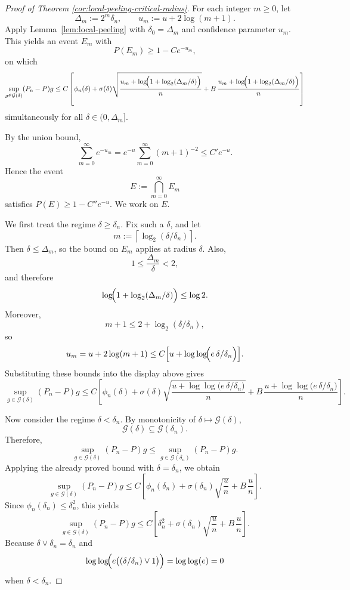 \documentclass[11pt]{article}
\theoremstyle{plain}
\theoremstyle{definition} %
\begin{document}
\begin{proof}[Proof of Theorem \ref{cor:local-peeling-critical-radius}]
For each integer \(m\ge 0\), let
\[
\Delta_m:=2^m\delta_n,
\qquad
u_m:=u+2\log(m+1).
\]
Apply Lemma~\ref{lem:local-peeling} with \(\delta_0=\Delta_m\) and confidence
parameter \(u_m\). This yields an event \(E_m\) with
\[
P(E_m)\ge 1-Ce^{-u_m},
\]
on which
\[
\sup_{g\in\mathcal G(\delta)} (P_n-P)g
\le
C\left[
\phi_n(\delta)
+
\sigma(\delta)
\sqrt{\frac{u_m+\log\!\Bigl(1+\log_2(\Delta_m/\delta)\Bigr)}{n}}
+
B\,\frac{u_m+\log\!\Bigl(1+\log_2(\Delta_m/\delta)\Bigr)}{n}
\right]
\]
simultaneously for all \(\delta\in(0,\Delta_m]\).

By the union bound,
\[
\sum_{m=0}^\infty e^{-u_m}
=
e^{-u}\sum_{m=0}^\infty (m+1)^{-2}
\le
C' e^{-u}.
\]
Hence the event
\[
E:=\bigcap_{m=0}^\infty E_m
\]
satisfies \(P(E)\ge 1-C''e^{-u}\). We work on \(E\).

We first treat the regime \(\delta\ge \delta_n\). Fix such a \(\delta\), and let
\[
m:=\left\lceil \log_2(\delta/\delta_n)\right\rceil.
\]
Then \(\delta\le \Delta_m\), so the bound on \(E_m\) applies at radius
\(\delta\). Also,
\[
1\le \frac{\Delta_m}{\delta}<2,
\]
and therefore
\[
\log\!\Bigl(1+\log_2(\Delta_m/\delta)\Bigr)\le \log 2.
\]
Moreover,
\[
m+1 \le 2+\log_2(\delta/\delta_n),
\]
so
\[
u_m
=
u+2\log(m+1)
\le
C\Bigl[u+\log\log\!\Bigl(e\,\delta/\delta_n\Bigr)\Bigr].
\]
Substituting these bounds into the display above gives
\[
\sup_{g\in\mathcal G(\delta)} (P_n-P)g
\le
C\left[
\phi_n(\delta)
+
\sigma(\delta)
\sqrt{\frac{u+\log\log\!\bigl(e\,\delta/\delta_n\bigr)}{n}}
+
B\,\frac{u+\log\log\!\bigl(e\,\delta/\delta_n\bigr)}{n}
\right].
\]

Now consider the regime \(\delta<\delta_n\). By monotonicity of
\(\delta\mapsto \mathcal G(\delta)\),
\[
\mathcal G(\delta)\subseteq \mathcal G(\delta_n).
\]
Therefore,
\[
\sup_{g\in\mathcal G(\delta)} (P_n-P)g
\le
\sup_{g\in\mathcal G(\delta_n)} (P_n-P)g.
\]
Applying the already proved bound with \(\delta=\delta_n\), we obtain
\[
\sup_{g\in\mathcal G(\delta)} (P_n-P)g
\le
C\left[
\phi_n(\delta_n)
+
\sigma(\delta_n)\sqrt{\frac{u}{n}}
+
B\,\frac{u}{n}
\right].
\]
Since \(\phi_n(\delta_n)\le \delta_n^2\), this yields
\[
\sup_{g\in\mathcal G(\delta)} (P_n-P)g
\le
C\left[
\delta_n^2
+
\sigma(\delta_n)\sqrt{\frac{u}{n}}
+
B\,\frac{u}{n}
\right].
\]
Because \(\delta\vee\delta_n=\delta_n\) and
\[
\log\log\!\Bigl(e\bigl((\delta/\delta_n)\vee 1\bigr)\Bigr)
=
\log\log(e)
=
0
\]
when \(\delta<\delta_n\).


\end{proof}
\end{document}
